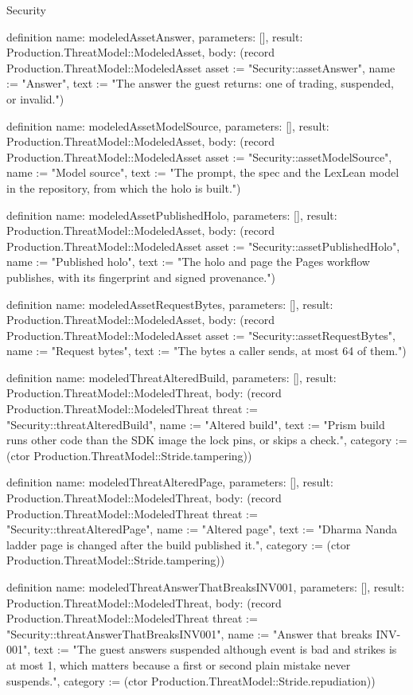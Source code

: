 \begin{lexlean}{Security}
\begin{semanticmodule}
definition{
  name: modeledAssetAnswer,
  parameters: [],
  result: Production.ThreatModel::ModeledAsset,
  body: (record Production.ThreatModel::ModeledAsset {asset := "Security::assetAnswer", name := "Answer", text := "The answer the guest returns: one of trading, suspended, or invalid."})
}

definition{
  name: modeledAssetModelSource,
  parameters: [],
  result: Production.ThreatModel::ModeledAsset,
  body: (record Production.ThreatModel::ModeledAsset {asset := "Security::assetModelSource", name := "Model source", text := "The prompt, the spec and the LexLean model in the repository, from which the holo is built."})
}

definition{
  name: modeledAssetPublishedHolo,
  parameters: [],
  result: Production.ThreatModel::ModeledAsset,
  body: (record Production.ThreatModel::ModeledAsset {asset := "Security::assetPublishedHolo", name := "Published holo", text := "The holo and page the Pages workflow publishes, with its fingerprint and signed provenance."})
}

definition{
  name: modeledAssetRequestBytes,
  parameters: [],
  result: Production.ThreatModel::ModeledAsset,
  body: (record Production.ThreatModel::ModeledAsset {asset := "Security::assetRequestBytes", name := "Request bytes", text := "The bytes a caller sends, at most 64 of them."})
}

definition{
  name: modeledThreatAlteredBuild,
  parameters: [],
  result: Production.ThreatModel::ModeledThreat,
  body: (record Production.ThreatModel::ModeledThreat {threat := "Security::threatAlteredBuild", name := "Altered build", text := "Prism build runs other code than the SDK image the lock pins, or skips a check.", category := (ctor Production.ThreatModel::Stride.tampering)})
}

definition{
  name: modeledThreatAlteredPage,
  parameters: [],
  result: Production.ThreatModel::ModeledThreat,
  body: (record Production.ThreatModel::ModeledThreat {threat := "Security::threatAlteredPage", name := "Altered page", text := "Dharma Nanda ladder page is changed after the build published it.", category := (ctor Production.ThreatModel::Stride.tampering)})
}

definition{
  name: modeledThreatAnswerThatBreaksINV001,
  parameters: [],
  result: Production.ThreatModel::ModeledThreat,
  body: (record Production.ThreatModel::ModeledThreat {threat := "Security::threatAnswerThatBreaksINV001", name := "Answer that breaks INV-001", text := "The guest answers suspended although event is bad and strikes is at most 1, which matters because a first or second plain mistake never suspends.", category := (ctor Production.ThreatModel::Stride.repudiation)})
}


\end{semanticmodule}
\end{lexlean}
